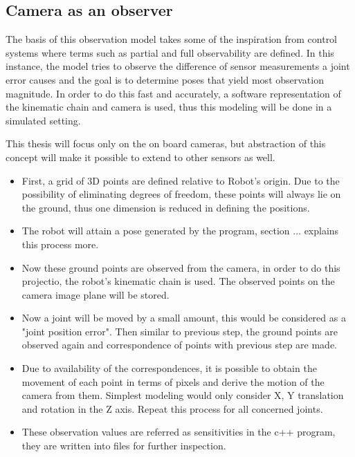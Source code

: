 \documentclass[english, printversion, nomenclature, notitle]{tuvisionthesis} %
\makeatletter
\renewcommand{\todo}[2][]{\tikzexternaldisable\@todo[#1]{#2}\tikzexternalenable}
\makeatother
\begin{document}
\subsection{Camera as an observer}

\todo{move to methodology}

The basis of this observation model takes some of the inspiration from control systems where terms such as partial and full observability are defined. In this instance, the model tries to observe the difference of sensor measurements a joint error causes and the goal is to determine poses that yield most observation magnitude. In order to do this fast and accurately, a software representation of the kinematic chain and camera is used, thus this modeling will be done in a simulated setting.

This thesis will focus only on the on board cameras, but abstraction of this concept will make it possible to extend to other sensors as well.

\begin{itemize}
	\item First, a grid of 3D points are defined relative to Robot's origin. Due to the possibility of eliminating degrees of freedom, these points will always lie on the ground, thus one dimension is reduced in defining the positions.
	\item The robot will attain a pose generated by the program, section ... \todo{ref} explains this process more.
	\item Now these ground points are observed from the camera, in order to do this projectio, the robot's kinematic chain is used. The observed points on the camera image plane will be stored.
	\item Now a joint will be moved by a small amount, this would be considered as a "joint position error". Then similar to previous step, the ground points are observed again and correspondence of points with previous step are made.
	\item Due to availability of the correspondences, it is possible to obtain the movement of each point in terms of pixels and derive the motion of the camera from them. Simplest modeling would only consider X, Y translation and rotation in the Z axis. Repeat this process for all concerned joints.
	\item These observation values are referred as sensitivities in the c++ program, they are written into files for further inspection.	
\end{itemize}
\end{document}
